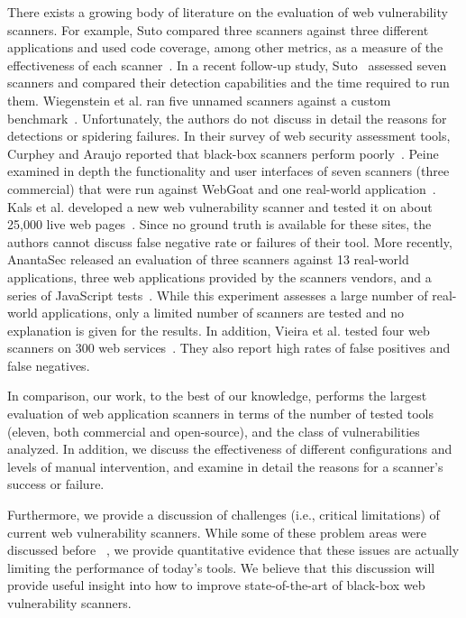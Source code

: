 There exists a growing body of literature on the evaluation of web
vulnerability scanners. For example, 
Suto compared three scanners against three different applications and
used code coverage, among other metrics, as a measure of the
effectiveness of each scanner~\cite{suto07}. In a recent follow-up study,
Suto~\cite{suto10:webscanners} assessed seven scanners and compared
their detection capabilities and the time required to run them.
Wiegenstein et al. ran five unnamed scanners against a custom
benchmark~\cite{wiegenstein06}. Unfortunately, the authors do not discuss in
detail the reasons for detections or spidering failures.
In their survey of web security assessment tools, Curphey
and Araujo reported that black-box scanners perform
poorly~\cite{curphey06}.
Peine examined in depth the functionality and user interfaces of seven
scanners (three commercial) that were run against WebGoat
and one real-world application~\cite{peine06}.
Kals et al. developed a new web vulnerability scanner and tested it on
about 25,000 live web pages~\cite{kals06:secubat}. Since no ground
truth is available for these sites, the authors cannot discuss false
negative rate or failures of their tool.
More recently, AnantaSec released an evaluation of three scanners against
13 real-world applications, three web applications provided by the 
scanners vendors, and a series of JavaScript tests~\cite{anantasec09}. 
While this experiment assesses a large number of real-world
applications, only a limited number of scanners are tested and no
explanation is given for the results.
In addition, Vieira et al. tested four web scanners on 300 web
services~\cite{vieira09}. They also report high rates of false
positives and false negatives.

In comparison, our work, to the best of our knowledge, performs the largest evaluation of web
application scanners in terms of the number of tested tools (eleven,
both commercial and open-source), and the class of vulnerabilities analyzed.
In addition, we discuss the effectiveness of different
configurations and levels of manual intervention, and examine in detail
the reasons for a scanner's success or failure.

Furthermore, we provide a discussion of challenges (i.e., critical
limitations) of current web vulnerability scanners. While some of these
problem areas were discussed before ~\cite{grossman04,mcallister08}, we provide quantitative
evidence that these issues are actually limiting the performance of
today's tools.
We believe that this discussion will provide useful insight into
how to improve state-of-the-art of black-box web vulnerability scanners.


